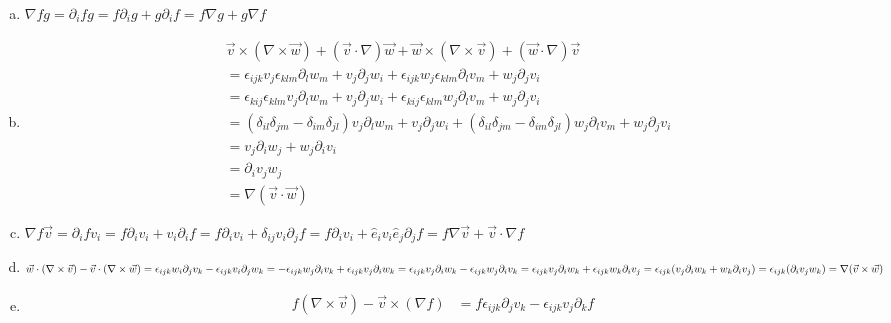 \documentclass[a4paper,german,12pt,smallheadings]{scrartcl}
\begin{document}
\begin{enumerate}[a)]
  \item $\nabla fg = \partial_i f g = f \partial_i g + g \partial_i f = f \nabla g + g \nabla f$
  \item
    \begin{align*}
      &\vec{v} \times (\nabla \times \vec{w}) + (\vec{v} \cdot \nabla) \vec{w} + \vec{w} \times (\nabla \times \vec{v}) + (\vec{w} \cdot \nabla) \vec{v} \\
      &= \epsilon_{ijk} v_j \epsilon_{klm} \partial_l w_m + v_j \partial_j w_i + \epsilon_{ijk} w_j \epsilon_{klm} \partial_l v_m + w_j \partial_j v_i\\
      &= \epsilon_{kij} \epsilon_{klm} v_j \partial_l w_m + v_j \partial_j w_i + \epsilon_{kij} \epsilon_{klm} w_j \partial_l v_m + w_j \partial_j v_i\\
      &= (\delta_{il} \delta_{jm} - \delta_{im} \delta_{jl}) v_j \partial_l w_m + v_j \partial_j w_i + (\delta_{il} \delta_{jm} - \delta_{im}\delta_{jl}) w_j \partial_l v_m + w_j \partial_j v_i\\
      &= v_j \partial_i w_j + w_j \partial_i v_i\\
      &= \partial_i v_j w_j\\
      &= \nabla(\vec{v} \cdot \vec{w})
    \end{align*}
  \item $\nabla f \vec{v}
    = \partial_i f v_i
    = f \partial_i v_i + v_i \partial_i f
    = f \partial_i v_i + \delta_{ij} v_i \partial_j f
    = f \partial_i v_i + \hat{e}_iv_i \hat{e}_j \partial_j f
    = f \nabla \vec{v} + \vec{v} \cdot \nabla f$
  \item $\vec{w} \cdot (\nabla \times \vec{v}) - \vec{v} \cdot (\nabla \times \vec{w})
    = \epsilon_{ijk}w_i\partial_jv_k - \epsilon_{ijk} v_i \partial_j w_k
    = -\epsilon_{ijk} w_j \partial_ iv_k + \epsilon_{ijk} v_j \partial_i w_k \\
    =  \epsilon_{ijk} v_j \partial_i w_k - \epsilon_{ijk} w_j \partial_i v_k
    =  \epsilon_{ijk} v_j \partial_i w_k + \epsilon_{ijk} w_k \partial_i v_j
    =  \epsilon_{ijk} (v_j \partial_i w_k + w_k \partial_i v_j) \\
    =  \epsilon_{ijk} (\partial_i v_j w_k)
    = \nabla (\vec{v} \times \vec{w})$
  \item
    \begin{align*}
      f(\nabla \times \vec{v}) - \vec{v} \times (\nabla f)
      &= f \epsilon_{ijk} \partial_j v_k - \epsilon_{ijk} v_j \partial_k f \\

\end{align*}
\end{enumerate}
\end{document}
